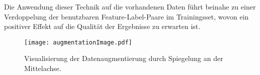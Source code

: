 Die Anwendung dieser Technik auf die vorhandenen Daten führt beinahe zu einer Verdoppelung 
der benutzbaren Feature-Label-Paare im Trainingsset, wovon ein positiver Effekt auf die Qualität der Ergebnisse zu erwarten ist.

\begin{figure}[hb]
	\centering
	\texttt{[image: augmentationImage.pdf]}
	\caption[Visualisierung der Datenaugmentierung]{Visualisierung der Datenaugmentierung durch Spiegelung an der Mittelachse.}
	\label{fig:dataAugm}
\end{figure}


















